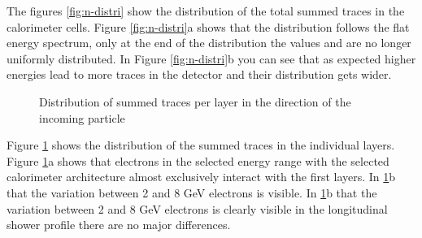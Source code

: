 \documentclass[12pt, a4paper]{thesis}
\begin{document}
The figures \ref{fig:n-distri} show the distribution of the total
summed traces in the calorimeter cells. Figure \ref{fig:n-distri}a
shows that the distribution follows the flat energy spectrum, only at
the end of the distribution the values and are no longer uniformly
distributed. In Figure \ref{fig:n-distri}b you can see that as
expected higher energies lead to more traces in the detector and their
distribution gets wider.

\begin{figure}[hbtp]%
  \centering
  \qquad
  \caption{Distribution of summed traces per layer in the direction of the incoming particle}%
  \label{fig:x-distri}%
\end{figure}

Figure \ref{fig:x-distri} shows the distribution of the summed traces
in the individual layers. Figure \ref{fig:x-distri}a shows that
electrons in the selected energy range with the selected calorimeter
architecture almost exclusively interact with the first layers. In
\ref{fig:x-distri}b that the variation between 2 and 8 GeV electrons
is visible. In \ref{fig:x-distri}b that the variation between 2 and 8
GeV electrons is clearly visible in the longitudinal shower profile
there are no major differences.
\end{document}
